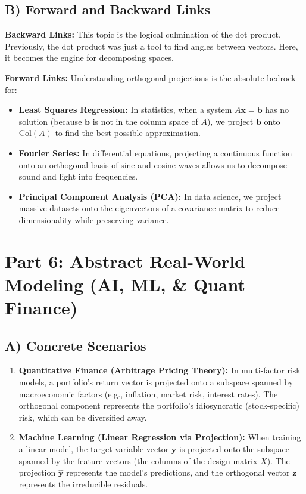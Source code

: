 \documentclass[11pt, letterpaper]{article}
\theoremstyle{definition}
\theoremstyle{remark}
\begin{document}
\subsection{B) Forward and Backward Links}
\textbf{Backward Links:} This topic is the logical culmination of the dot product. Previously, the dot product was just a tool to find angles between vectors. Here, it becomes the engine for decomposing spaces.

\textbf{Forward Links:} Understanding orthogonal projections is the absolute bedrock for:
\begin{itemize}
    \item \textbf{Least Squares Regression:} In statistics, when a system $A\mathbf{x} = \mathbf{b}$ has no solution (because $\mathbf{b}$ is not in the column space of $A$), we project $\mathbf{b}$ onto $\text{Col}(A)$ to find the best possible approximation.
    \item \textbf{Fourier Series:} In differential equations, projecting a continuous function onto an orthogonal basis of sine and cosine waves allows us to decompose sound and light into frequencies.
    \item \textbf{Principal Component Analysis (PCA):} In data science, we project massive datasets onto the eigenvectors of a covariance matrix to reduce dimensionality while preserving variance.
\end{itemize}

\section{Part 6: Abstract Real-World Modeling (AI, ML, \& Quant Finance)}

\subsection{A) Concrete Scenarios}
\begin{enumerate}
    \item \textbf{Quantitative Finance (Arbitrage Pricing Theory):} In multi-factor risk models, a portfolio's return vector is projected onto a subspace spanned by macroeconomic factors (e.g., inflation, market risk, interest rates). The orthogonal component represents the portfolio's idiosyncratic (stock-specific) risk, which can be diversified away.
    \item \textbf{Machine Learning (Linear Regression via Projection):} When training a linear model, the target variable vector $\mathbf{y}$ is projected onto the subspace spanned by the feature vectors (the columns of the design matrix $X$). The projection $\hat{\mathbf{y}}$ represents the model's predictions, and the orthogonal vector $\mathbf{z}$ represents the irreducible residuals.
\end{enumerate}
\end{document}
